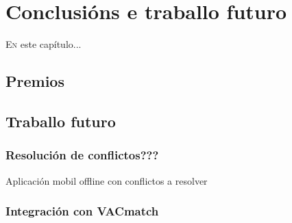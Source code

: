 \chapter{Conclusións e traballo futuro}
\minitoc


  \lettrine{E}{n} este capítulo...


\section{Premios}

\section{Traballo futuro}

  \subsection{Resolución de conflictos???}
  Aplicación mobil offline con conflictos a resolver

  \subsection{Integración con VACmatch}
